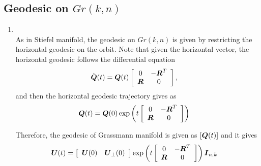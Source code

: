 \documentclass[11pt]{article}
\begin{document}
\subsection{Geodesic on $Gr(k, n)$}
\begin{enumerate}
\item \citep{edelman1998geometry}\\ As in Stiefel manifold, the geodesic on $Gr(k,n)$ is given by restricting the horizontal geodesic on the orbit. Note that given the horizontal vector, the horizontal geodesic follows the differential equation
\begin{align*}
\dot{\boldsymbol{Q}}(t) &= \boldsymbol{Q}(t)\left[\begin{array}{cc}
0 & -\boldsymbol{R}^{T} \\ 
\boldsymbol{R} & 0
\end{array} \right],
\end{align*}
and then the horizontal geodesic trajectory gives as
\begin{align}
\boldsymbol{Q}(t) &= \boldsymbol{Q}(0)\exp\left(t \left[\begin{array}{cc}
0 & -\boldsymbol{R}^{T} \\ 
\boldsymbol{R} & 0
\end{array} \right]\right) \label{eqn: geo_horizontal_Grass}
\end{align}

Therefore, the geodesic of Grassmann manifold is given as $\left[\boldsymbol{Q}(t)\right]$ and it gives 
\begin{align}
\boldsymbol{U}(t) &= \left[\begin{array}{cc}
\boldsymbol{U}(0) & \boldsymbol{U}_{\bot}(0)
\end{array}\right]\exp\left(t \left[\begin{array}{cc}
0 & -\boldsymbol{R}^{T} \\ 
\boldsymbol{R} & 0
\end{array} \right]\right)\boldsymbol{I}_{n,k}
\end{align}


\end{enumerate}
\end{document}
